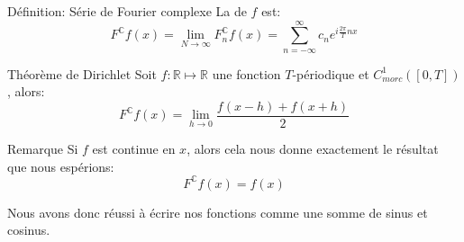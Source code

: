 \documentclass[a4paper]{article}
\begin{document}
\begin{parag}{Définition: Série de Fourier complexe}
    La  de $f$ est: 
    \[F^{\mathbb{C}} f\left(x\right) = \lim_{N \to \infty} F_n^{\mathbb{C}}f\left(x\right) = \sum_{n=-\infty}^{\infty} c_n e^{i \frac{2\pi}{T} nx}\]
\end{parag}

\begin{parag}{Théorème de Dirichlet}
    Soit $f: \mathbb{R} \mapsto \mathbb{R}$ une fonction $T$-périodique et $C^1_{morc}\left(\left[0, T\right]\right)$, alors: 
    \[F^{\mathbb{C}} f\left(x\right) = \lim_{h \to 0} \frac{f\left(x - h\right) + f\left(x + h\right)}{2}\]
    
    \begin{subparag}{Remarque}
        Si $f$ est continue en $x$, alors cela nous donne exactement le résultat que nous espérions: 
        \[F^{\mathbb{C}}f\left(x\right) = f\left(x\right)\]

        Nous avons donc réussi à écrire nos fonctions comme une somme de sinus et cosinus.
    \end{subparag}
\end{parag}
\end{document}
